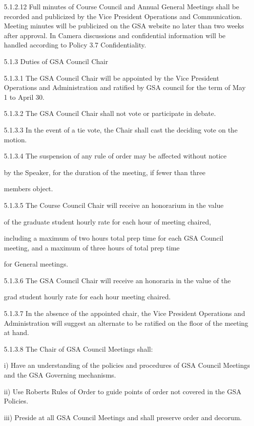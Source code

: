  5.1.2.12 Full minutes of Course Council and Annual General Meetings shall 
 be recorded and publicized by the Vice President Operations and 
 Communication. Meeting minutes will be publicized on the GSA 
 website no later than two weeks after approval. In Camera 
 discussions and confidential information will be handled according 
 to Policy 3.7 Confidentiality. 
 
 
 5.1.3 Duties of GSA Council Chair 
 
 5.1.3.1 The GSA Council Chair will be appointed by the Vice President 
 Operations and Administration and ratified by GSA council for the 
 term of May 1 to April 30. 
 
 5.1.3.2 The GSA Council Chair shall not vote or participate in debate. 
 
 5.1.3.3 In the event of a tie vote, the Chair shall cast the deciding vote on 
 the motion. 
 
 5.1.3.4 The suspension of any rule of order may be affected without notice 
 
 by the Speaker, for the duration of the meeting, if fewer than three 
 
 members object. 
 
 5.1.3.5 The Course Council Chair will receive an honorarium in the value 
 
 of the graduate student hourly rate for each hour of meeting chaired, 
 
 including a maximum of two hours total prep time for each GSA Council meeting, and a maximum of three hours of total prep time 
 
 for General meetings. 
 
 5.1.3.6 The GSA Council Chair will receive an honoraria in the value of the 
 
 grad student hourly rate for each hour meeting chaired. 
 
 5.1.3.7 In the absence of the appointed chair, the Vice President Operations 
 and Administration will suggest an alternate to be ratified on the 
 floor of the meeting at hand. 
 
 5.1.3.8 The Chair of GSA Council Meetings shall: 
 
 i) Have an understanding of the policies and procedures of GSA 
 Council Meetings and the GSA Governing mechanisms. 
 
 ii) Use Roberts Rules of Order to guide points of order not covered in 
 the GSA Policies. 
 
 iii) Preside at all GSA Council Meetings and shall preserve order and 
 decorum. 
 
